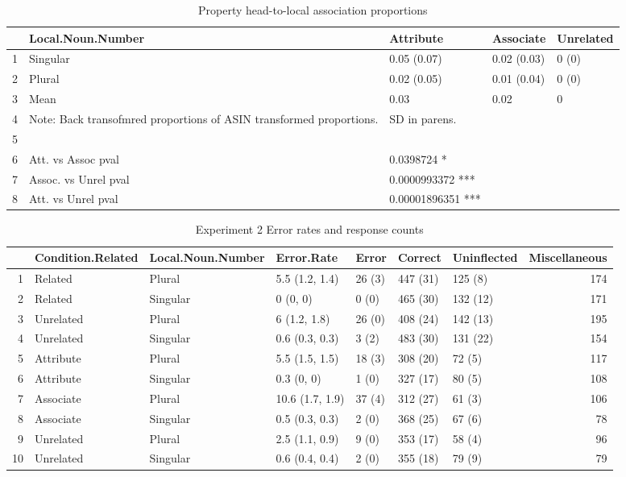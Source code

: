\documentclass[a4paper,11pt]{article}\usepackage[]{graphicx}\usepackage[]{color}
\begin{document}
\begin{landscape}
\begin{table}[ht]
\centering
\begin{tabular}{rllll}
  \hline
 & Local.Noun.Number & Attribute & Associate & Unrelated \\ 
  \hline
1 & Singular & 0.05 (0.07) & 0.02 (0.03) & 0 (0) \\ 
  2 & Plural & 0.02 (0.05) & 0.01 (0.04) & 0 (0) \\ 
  3 & Mean & 0.03 & 0.02 & 0 \\ 
  4 & Note: Back transofmred proportions of ASIN transformed proportions. & SD in parens. &  &  \\ 
  5 &  &  &  &  \\ 
  6 & Att. vs Assoc pval & 0.0398724 * &  &  \\ 
  7 & Assoc. vs Unrel pval & 0.0000993372 *** &  &  \\ 
  8 & Att. vs Unrel pval & 0.00001896351 *** &  &  \\ 
   \hline
\end{tabular}
\caption[PROP association]{Property head-to-local association proportions} 
\end{table}


\begin{table}[ht]
\centering
\begin{tabular}{rllllllr}
  \hline
 & Condition.Related & Local.Noun.Number & Error.Rate & Error & Correct & Uninflected & Miscellaneous \\ 
  \hline
1 & Related & Plural & 5.5 (1.2, 1.4) & 26 (3) & 447 (31) & 125 (8) & 174 \\ 
  2 & Related & Singular & 0 (0, 0) & 0 (0) & 465 (30) & 132 (12) & 171 \\ 
  3 & Unrelated & Plural & 6 (1.2, 1.8) & 26 (0) & 408 (24) & 142 (13) & 195 \\ 
  4 & Unrelated & Singular & 0.6 (0.3, 0.3) & 3 (2) & 483 (30) & 131 (22) & 154 \\ 
  5 & Attribute & Plural & 5.5 (1.5, 1.5) & 18 (3) & 308 (20) & 72 (5) & 117 \\ 
  6 & Attribute & Singular & 0.3 (0, 0) & 1 (0) & 327 (17) & 80 (5) & 108 \\ 
  7 & Associate  & Plural & 10.6 (1.7, 1.9) & 37 (4) & 312 (27) & 61 (3) & 106 \\ 
  8 & Associate  & Singular & 0.5 (0.3, 0.3) & 2 (0) & 368 (25) & 67 (6) &  78 \\ 
  9 & Unrelated & Plural & 2.5 (1.1, 0.9) & 9 (0) & 353 (17) & 58 (4) &  96 \\ 
  10 & Unrelated & Singular & 0.6 (0.4, 0.4) & 2 (0) & 355 (18) & 79 (9) &  79 \\ 
   \hline
\end{tabular}
\caption[Exp. 2 Error rates]{Experiment 2 Error rates and response counts} 
\end{table}

\end{landscape}
\end{document}
